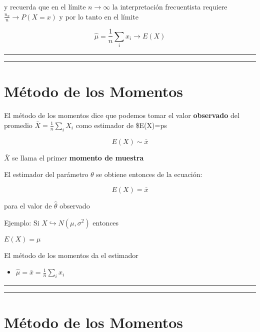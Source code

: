 \documentclass[
]{book}
\providecommand{\tightlist}{%
  \setlength{\itemsep}{0pt}\setlength{\parskip}{0pt}}
\begin{document}
y recuerda que en el límite \(n \rightarrow \infty\) la interpretación frecuentista requiere \(\frac{n_x}{n} \rightarrow P(X=x)\) y por lo tanto en el límite

\[\hat{\mu}=\frac{1}{n}\sum_i x_i \rightarrow E(X)\]

\begin{center}\rule{0.5\linewidth}{0.5pt}\end{center}

\begin{center}\rule{0.5\linewidth}{0.5pt}\end{center}

\hypertarget{muxe9todo-de-los-momentos-2}{%
\section{Método de los Momentos}\label{muxe9todo-de-los-momentos-2}}

El método de los momentos dice que podemos tomar el valor \textbf{observado} del promedio \(\bar{X}= \frac{1}{n}\sum_i X_i\) como estimador de \$E(X)=\mu ps

\[E(X)\sim\bar{x}\]

\(\bar{X}\) se llama el primer \textbf{momento de muestra}

El estimador del parámetro \(\theta\) se obtiene entonces de la ecuación:

\[E(X)=\bar{x}\]

para el valor de \(\hat{\theta}\) observado

Ejemplo: Si
\(X \hookrightarrow N(\mu, \sigma^2)\) entonces

\(E(X)=\mu\)

El método de los momentos da el estimador

\begin{itemize}
\tightlist
\item
  \(\hat{\mu}=\bar{x}=\frac{1}{n}\sum_i x_i\)
\end{itemize}

\begin{center}\rule{0.5\linewidth}{0.5pt}\end{center}

\begin{center}\rule{0.5\linewidth}{0.5pt}\end{center}

\hypertarget{muxe9todo-de-los-momentos-3}{%
\section{Método de los Momentos}\label{muxe9todo-de-los-momentos-3}}
\end{document}
